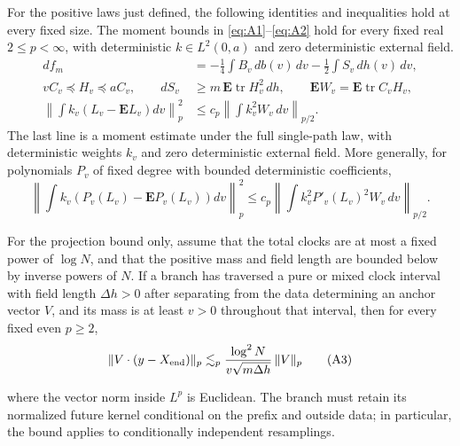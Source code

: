 \begin{lemma}
\label{found:estimates}
For the positive laws just defined, the following identities and
inequalities hold at every fixed size. The moment bounds in
\eqref{eq:A1}--\eqref{eq:A2} hold for every fixed real \(2\le p<\infty\),
with deterministic \(k\in L^2(0,a)\) and zero deterministic external
field.
\[
\begin{split}
 df_m&=-\tfrac14\int B_v\,db(v)\,dv-\tfrac12\int S_v\,dh(v)\,dv,\\
 vC_v\preceq H_v\preceq a C_v,\qquad
 d S_v&\ge m\,\mathbf E\operatorname{tr}H_v^2\,dh,\qquad
 \mathbf EW_v=\mathbf E\operatorname{tr}C_v H_v,\\
 \left\|\int k_v(L_v-\mathbf EL_v)dv\right\|_p^2&\le c_p\left\|\int k_v^2 W_v\,dv\right\|_{p/2}.
\end{split}                                                    \tag{A1}\label{eq:A1}
\]
The last line is a moment estimate under the full single-path law, with
deterministic weights \(k_v\) and zero deterministic external field.
More generally, for
polynomials \(P_v\) of fixed degree with bounded deterministic coefficients,
\[
 \left\|\int k_v(P_v(L_v)-\mathbf E P_v(L_v))dv\right\|_p^2
 \le c_p\left\|\int k_v^2 P'_v(L_v)^2 W_v\,dv\right\|_{p/2}.
                                                               \tag{A2}\label{eq:A2}
\]

For the projection bound only, assume that the total clocks are at most
a fixed power of \(\log N\), and that the positive mass and field
length are bounded below by inverse powers of \(N\). If a branch
has traversed a pure or mixed clock interval with field length
\(\Delta h>0\) after separating from the data determining an anchor
vector \(V\), and its mass is at least \(v>0\) throughout that
interval, then for every fixed even \(p\ge2\),
\[
 \|V\cdot(y-X_{\rm end})\|_p
 \lesssim_p \frac{\log^2 N}{v\sqrt{m\Delta h}}\,\|V\|_p                       \tag{A3}\label{eq:A3}
\]

where the vector norm inside \(L^p\) is Euclidean. The branch must
retain its normalized future kernel conditional on the prefix and outside
data; in particular, the bound applies to conditionally independent
resamplings.
\end{lemma}

